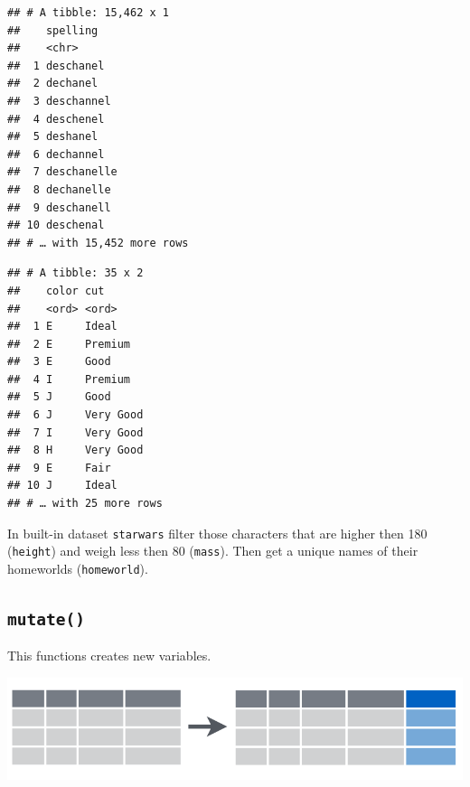 \documentclass[
]{book}
\makeatletter
\newenvironment{Shaded}{\begin{snugshade}}{\end{snugshade}}
\newcommand{\DataTypeTok}[1]{\textcolor[rgb]{0.13,0.29,0.53}{#1}}
\newcommand{\DecValTok}[1]{\textcolor[rgb]{0.00,0.00,0.81}{#1}}
\newcommand{\KeywordTok}[1]{\textcolor[rgb]{0.13,0.29,0.53}{\textbf{#1}}}
\newcommand{\NormalTok}[1]{#1}
\newcommand{\OperatorTok}[1]{\textcolor[rgb]{0.81,0.36,0.00}{\textbf{#1}}}
\newcommand{\StringTok}[1]{\textcolor[rgb]{0.31,0.60,0.02}{#1}}
\newenvironment{kframe}{%
\medskip{}
\setlength{\fboxsep}{.8em}
 \def\at@end@of@kframe{}%
 \ifinner\ifhmode%
  \def\at@end@of@kframe{\end{minipage}}%
  \begin{minipage}{\columnwidth}%
 \fi\fi%
 \def\FrameCommand##1{\hskip\@totalleftmargin \hskip-\fboxsep
 \colorbox{shadecolor}{##1}\hskip-\fboxsep
     \hskip-\linewidth \hskip-\@totalleftmargin \hskip\columnwidth}%
 \MakeFramed {\advance\hsize-\width
   \@totalleftmargin\z@ \linewidth\hsize
   \@setminipage}}%
 {\par\unskip\endMakeFramed%
 \at@end@of@kframe}
\newenvironment{rmdblock}[1]
  {
  \begin{itemize}
  \renewcommand{\labelitemi}{
    \raisebox{-.7\height}[0pt][0pt]{
      {\setkeys{Gin}{width=3em,keepaspectratio}\texttt{[image: images/\#1]}}
    }
  }
  \setlength{\fboxsep}{1em}
  \begin{kframe}
  \item
  }
  {
  \end{kframe}
  \end{itemize}
  }
\newenvironment{rmdtask}
  {\begin{rmdblock}{task}}
  {\end{rmdblock}}
\makeatother
\begin{document}
\begin{verbatim}
## # A tibble: 15,462 x 1
##    spelling   
##    <chr>      
##  1 deschanel  
##  2 dechanel   
##  3 deschannel 
##  4 deschenel  
##  5 deshanel   
##  6 dechannel  
##  7 deschanelle
##  8 dechanelle 
##  9 deschanell 
## 10 deschenal  
## # … with 15,452 more rows
\end{verbatim}

\begin{Shaded}
\end{Shaded}

\begin{verbatim}
## # A tibble: 35 x 2
##    color cut      
##    <ord> <ord>    
##  1 E     Ideal    
##  2 E     Premium  
##  3 E     Good     
##  4 I     Premium  
##  5 J     Good     
##  6 J     Very Good
##  7 I     Very Good
##  8 H     Very Good
##  9 E     Fair     
## 10 J     Ideal    
## # … with 25 more rows
\end{verbatim}

\begin{rmdtask}
In built-in dataset \texttt{starwars} filter those characters that are
higher then 180 (\texttt{height}) and weigh less then 80
(\texttt{mass}). Then get a unique names of their homeworlds
(\texttt{homeworld}).
\end{rmdtask}

\hypertarget{mutate}{%
\subsection{\texorpdfstring{\texttt{mutate()}}{mutate()}}\label{mutate}}

This functions creates new variables.

\includegraphics{images/02.04.mutate.png}

\begin{Shaded}
\end{Shaded}
\end{document}
